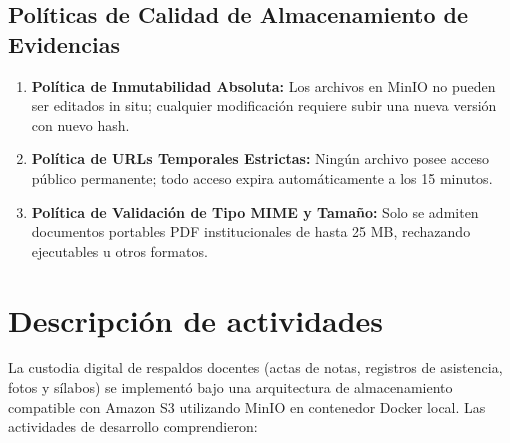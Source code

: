 \documentclass[12pt,a4paper]{article}
\begin{document}
\subsection{Políticas de Calidad de Almacenamiento de Evidencias}
\begin{enumerate}[leftmargin=1.5em, itemsep=2pt]
    \item \textbf{Política de Inmutabilidad Absoluta:} Los archivos en MinIO no pueden ser editados in situ; cualquier modificación requiere subir una nueva versión con nuevo hash.
    \item \textbf{Política de URLs Temporales Estrictas:} Ningún archivo posee acceso público permanente; todo acceso expira automáticamente a los 15 minutos.
    \item \textbf{Política de Validación de Tipo MIME y Tamaño:} Solo se admiten documentos portables PDF institucionales de hasta 25 MB, rechazando ejecutables u otros formatos.
\end{enumerate}

\section{Descripción de actividades}
La custodia digital de respaldos docentes (actas de notas, registros de asistencia, fotos y sílabos) se implementó bajo una arquitectura de almacenamiento compatible con Amazon S3 utilizando MinIO en contenedor Docker local. Las actividades de desarrollo comprendieron:
\end{document}
